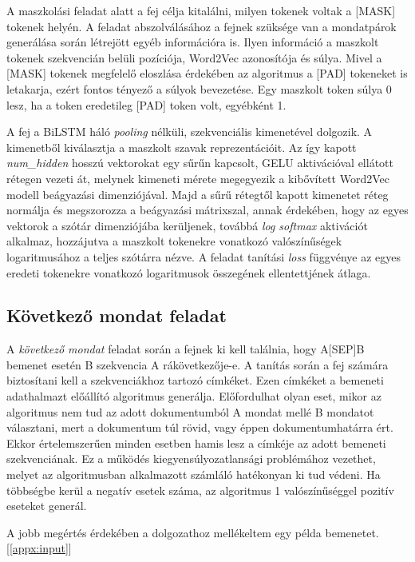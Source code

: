 A maszkolási feladat alatt a fej célja kitalálni, milyen tokenek voltak a [MASK] tokenek helyén. A feladat abszolválásához a fejnek szüksége van a mondatpárok generálása során létrejött egyéb információra is. Ilyen információ a maszkolt tokenek szekvencián belüli pozíciója, Word2Vec azonosítója és súlya. Mivel a [MASK] tokenek megfelelő eloszlása érdekében az algoritmus a [PAD] tokeneket is letakarja, ezért fontos tényező a súlyok bevezetése. Egy maszkolt token súlya 0 lesz, ha a token eredetileg [PAD] token volt, egyébként 1. 

A fej a BiLSTM háló \textit{pooling} nélküli, szekvenciális kimenetével dolgozik. A kimenetből kiválasztja a maszkolt szavak reprezentációit. Az így kapott \textit{num\_hidden} hosszú vektorokat egy sűrűn kapcsolt, GELU aktivációval \cite{gelu} ellátott rétegen vezeti át, melynek kimeneti mérete megegyezik a kibővített Word2Vec modell beágyazási dimenziójával. Majd a sűrű rétegtől kapott kimenetet réteg normálja \cite{layer} és megszorozza a beágyazási mátrixszal, annak érdekében, hogy az egyes vektorok a szótár dimenziójába kerüljenek, továbbá \textit{log softmax} aktivációt alkalmaz, hozzájutva a maszkolt tokenekre vonatkozó valószínűségek logaritmusához a teljes szótárra nézve. A feladat tanítási \textit{loss} függvénye az egyes eredeti tokenekre vonatkozó logaritmusok összegének ellentettjének átlaga.


\subsection{Következő mondat feladat}

A \textit{következő mondat} feladat során a fejnek ki kell találnia, hogy A[SEP]B bemenet esetén B szekvencia A rákövetkezője-e. A tanítás során a fej számára biztosítani kell a szekvenciákhoz tartozó címkéket. Ezen címkéket a bemeneti adathalmazt előállító algoritmus generálja. Előfordulhat olyan eset, mikor az algoritmus nem tud az adott dokumentumból A mondat mellé B mondatot választani, mert a dokumentum túl rövid, vagy éppen dokumentumhatárra ért. Ekkor értelemszerűen minden esetben hamis lesz a címkéje az adott bemeneti szekvenciának. Ez a működés kiegyensúlyozatlansági problémához vezethet, melyet az algoritmusban alkalmazott számláló hatékonyan ki tud védeni. Ha többségbe kerül a negatív esetek száma, az algoritmus 1 valószínűséggel pozitív eseteket generál. 

\begin{note}
	A jobb megértés érdekében a dolgozathoz mellékeltem egy példa bemenetet. [\ref{appx:input}]
\end{note}

